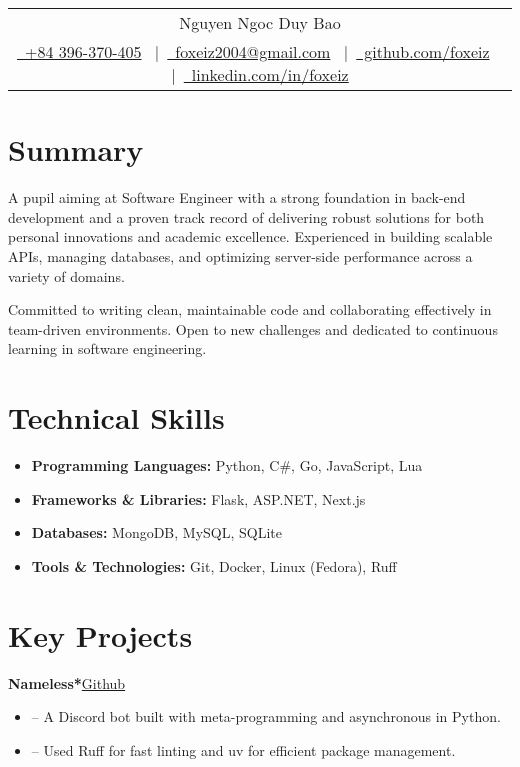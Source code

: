 \documentclass[a4paper,12pt]{article}
\newenvironment{itemList}[2]
    {
    \noindent\hspace{1em}\textbf{#1}\hfill#2\\[3.75pt]
    \begin{minipage}[t]{\linewidth}
    \begin{itemize}[nosep,after=\strut, leftmargin=2em, itemsep=3pt,label={}]
    }
    {
    \end{itemize}
    \end{minipage}
    }
\begin{document}
\pagestyle{empty}

\begin{tabularx}{\linewidth}{@{} C @{}}
    \Huge{Nguyen Ngoc Duy Bao} \\[7.5pt]
    \href{tel:+84396370405}{\raisebox{-0.05\height}\ +84 396-370-405} \ $|$\
    \href{mailto:foxeiz2004@gmail.com}{\raisebox{-0.05\height}\ foxeiz2004@gmail.com} \ $|$\
    \href{https://github.com/foxeiz}{\raisebox{-0.05\height}\ github.com/foxeiz} \ $|$\
    \href{https://linkedin.com/in/foxeiz}{\raisebox{-0.05\height}\ linkedin.com/in/foxeiz}
\end{tabularx}

\section{Summary}
A pupil aiming at Software Engineer with a strong foundation in back-end development and a proven track record of delivering robust solutions for both personal innovations and academic excellence. Experienced in building
scalable APIs, managing databases, and optimizing server-side performance across a variety of domains.

Committed to writing clean, maintainable code and collaborating effectively in team-driven environments. Open to new challenges and dedicated to continuous learning in software engineering.

\section{Technical Skills}
\begin{itemize}[nosep,after=\strut, leftmargin=1em, itemsep=4pt, label={}]
    \item \textbf{Programming Languages:} Python, C\#, Go, JavaScript, Lua
    \item \textbf{Frameworks \& Libraries:} Flask, ASP.NET, Next.js
    \item \textbf{Databases:} MongoDB, MySQL, SQLite
    \item \textbf{Tools \& Technologies:} Git, Docker, Linux (Fedora), Ruff
\end{itemize}

\section{Key Projects}

\begin{itemList}{Nameless*}{\href{https://github.com/team-nameless/nameless-discord-bot/}{Github}}
    \item -- A Discord bot built with meta-programming and asynchronous in Python.
    \item -- Used Ruff for fast linting and uv for efficient package management.
\end{itemList}
\end{document}
